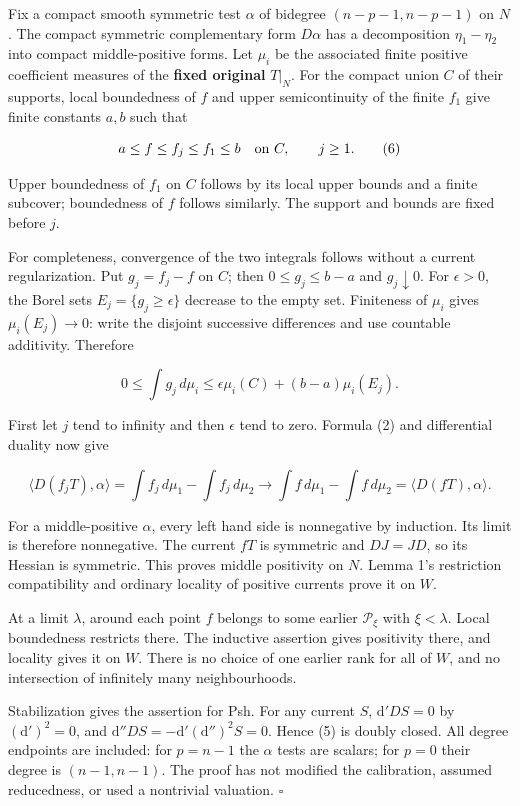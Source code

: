 \documentclass[
  11pt,
]{article}
\begin{document}
Fix a compact smooth symmetric test \(\alpha\) of bidegree
\((n-p-1,n-p-1)\) on \(N\). The compact symmetric complementary form
\(D\alpha\) has a decomposition \(\eta_1-\eta_2\) into compact
middle-positive forms. Let \(\mu_i\) be the associated finite positive
coefficient measures of the \textbf{fixed original} \(T|_N\). For the
compact union \(C\) of their supports, local boundedness of \(f\) and
upper semicontinuity of the finite \(f_1\) give finite constants \(a,b\)
such that

\[ a\leq f\leq f_j\leq f_1\leq b\quad\hbox{on }C,\qquad j\geq1. \tag{6}\]

Upper boundedness of \(f_1\) on \(C\) follows by its local upper bounds
and a finite subcover; boundedness of \(f\) follows similarly. The
support and bounds are fixed before \(j\).

For completeness, convergence of the two integrals follows without a
current regularization. Put \(g_j=f_j-f\) on \(C\); then
\(0\leq g_j\leq b-a\) and \(g_j\downarrow0\). For \(\epsilon>0\), the
Borel sets \(E_j=\{g_j\geq\epsilon\}\) decrease to the empty set.
Finiteness of \(\mu_i\) gives \(\mu_i(E_j)\to0\): write the disjoint
successive differences and use countable additivity. Therefore

\[0\leq\int g_j\,d\mu_i
  \leq\epsilon\mu_i(C)+(b-a)\mu_i(E_j).\]

First let \(j\) tend to infinity and then \(\epsilon\) tend to zero.
Formula (2) and differential duality now give

\[ \langle D(f_jT),\alpha\rangle
     =\int f_j\,d\mu_1-\int f_j\,d\mu_2
     \longrightarrow
       \int f\,d\mu_1-\int f\,d\mu_2
     =\langle D(fT),\alpha\rangle. \tag{7}\]

For a middle-positive \(\alpha\), every left hand side is nonnegative by
induction. Its limit is therefore nonnegative. The current \(fT\) is
symmetric and \(DJ=JD\), so its Hessian is symmetric. This proves middle
positivity on \(N\). Lemma 1's restriction compatibility and ordinary
locality of positive currents prove it on \(W\).

At a limit \(\lambda\), around each point \(f\) belongs to some earlier
\(\mathcal P_\xi\) with \(\xi<\lambda\). Local boundedness restricts
there. The inductive assertion gives positivity there, and locality
gives it on \(W\). There is no choice of one earlier rank for all of
\(W\), and no intersection of infinitely many neighbourhoods.

Stabilization gives the assertion for Psh. For any current \(S\),
\(\mathrm d'DS=0\) by \((\mathrm d')^2=0\), and
\(\mathrm d''DS=-\mathrm d'(\mathrm d'')^2S=0\). Hence (5) is doubly
closed. All degree endpoints are included: for \(p=n-1\) the \(\alpha\)
tests are scalars; for \(p=0\) their degree is \((n-1,n-1)\). The proof
has not modified the calibration, assumed reducedness, or used a
nontrivial valuation. \(\square\)
\end{document}
